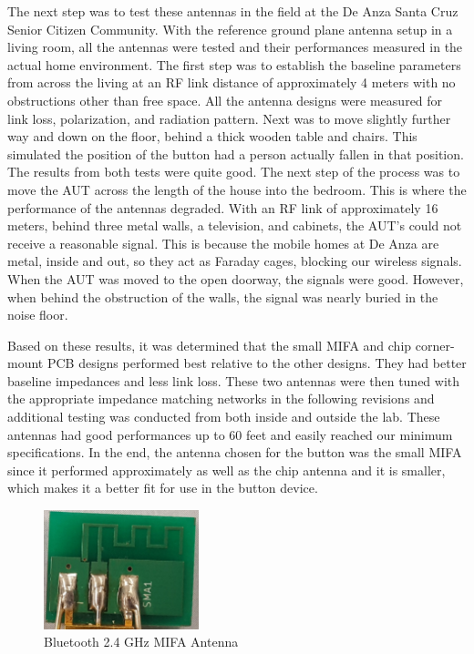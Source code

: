 \documentclass[journal,compsoc]{IEEEtran}
\begin{document}
The next step was to test these antennas in the field at the De Anza Santa Cruz Senior Citizen Community.  With the reference ground plane antenna setup in a living room, all the antennas were tested and their performances measured in the actual home environment.  The first step was to establish the baseline parameters from across the living at an RF link distance of approximately 4 meters with no obstructions other than free space.  All the antenna designs were measured for link loss, polarization, and radiation pattern.  Next was to move slightly further way and down on the floor, behind a thick wooden table and chairs.  This simulated the position of the button had a person actually fallen in that position.  The results from both tests were quite good.  The next step of the process was to move the AUT across the length of the house into the bedroom.  This is where the performance of the antennas degraded.  With an RF link of approximately 16 meters, behind three metal walls, a television, and cabinets, the AUT’s could not receive a reasonable signal.  This is because the mobile homes at De Anza are metal, inside and out, so they act as Faraday cages, blocking our wireless signals.  When the AUT was moved to the open doorway, the signals were good.  However, when behind the obstruction of the walls, the signal was nearly buried in the noise floor.


Based on these results, it was determined that the small MIFA and chip corner-mount PCB designs performed best relative to the other designs.  They had better baseline impedances and less link loss.  These two antennas were then tuned with the appropriate impedance matching networks in the following revisions and additional testing was conducted from both inside and outside the lab.  These antennas had good performances up to 60 feet and easily reached our minimum specifications.  In the end, the antenna chosen for the button was the small MIFA since it performed approximately as well as the chip antenna and it is smaller, which makes it a better fit for use in the button device.

\begin{figure}[ht]	%
\centering
\includegraphics[width=0.4\textwidth]{2_4GHzSMIFAAntenna.jpg}
\caption{Bluetooth 2.4 GHz MIFA Antenna}
\label{2.4 Small MIFA}
\end{figure}
\end{document}
